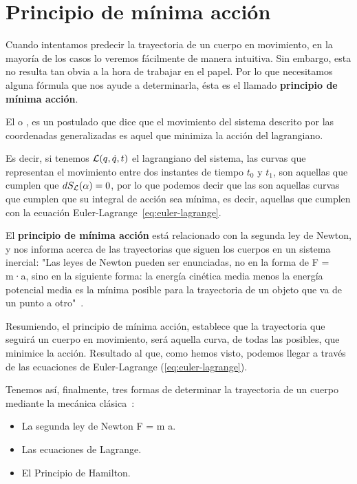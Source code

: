 \section{Principio de mínima acción}\label{sec:principio-de-minima-accion}

Cuando intentamos predecir la trayectoria de un cuerpo en movimiento, en la mayoría de los casos lo veremos fácilmente de manera intuitiva. Sin embargo, esta no resulta tan obvia a la hora de trabajar en el papel. Por lo que necesitamos alguna fórmula que nos ayude a determinarla, ésta es el llamado \textbf{principio de mínima acción}.

El  o , es un postulado que dice que el movimiento del sistema descrito por las coordenadas generalizadas es aquel que minimiza la acción del lagrangiano\label{po:pma}.

Es decir, si tenemos $\mathcal{L}(q,\dot{q}, t)$ el lagrangiano del sistema, las curvas que representan el movimiento entre dos instantes de tiempo $t_0$ y $t_1$, son aquellas que cumplen que $dS_{\mathcal{L}}(\alpha)=0$, por lo que podemos decir que las  son aquellas curvas que cumplen que su integral de acción sea mínima, es decir, aquellas que cumplen con la ecuación Euler-Lagrange~\eqref{eq:euler-lagrange}.

El \textbf{principio de mínima acción} está relacionado con la segunda ley de Newton, y nos informa acerca de las trayectorias que siguen los cuerpos en un sistema inercial:
"Las leyes de Newton pueden ser enunciadas, no en la forma de F = m·a, sino en la siguiente forma: la energía cinética media menos la energía potencial media es la mínima posible para la trayectoria de un objeto que va de un punto a otro"~\cite{Feynman}.

Resumiendo, el principio de mínima acción, establece que la trayectoria que seguirá un cuerpo en movimiento, será aquella curva, de todas las posibles, que minimice la acción. Resultado al que, como hemos visto, podemos llegar a través de las ecuaciones de Euler-Lagrange (\eqref{eq:euler-lagrange}).

Tenemos así, finalmente, tres formas de determinar la trayectoria de un cuerpo mediante la mecánica clásica~\autocite[264]{Taylor}:
\begin{itemize}
    \item La segunda ley de Newton F = m \cdot a.
    \item Las ecuaciones de Lagrange.
    \item El Principio de Hamilton.
\end{itemize}